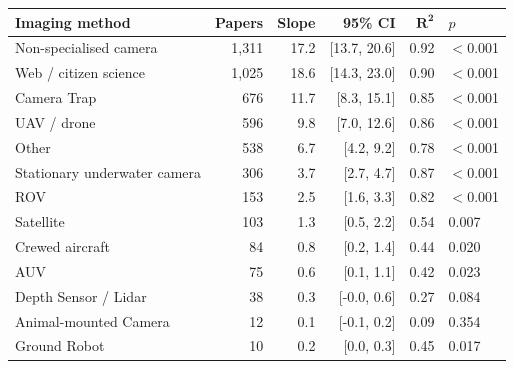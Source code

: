 \begin{tabular}{lrrrrl}
\toprule
\textbf{Imaging method} & \textbf{Papers} & \textbf{Slope} & \textbf{95\% CI} & $\mathbf{R^2}$ & \textbf{$p$} \\
\midrule
Non-specialised camera & 1,311 & 17.2 & [13.7, 20.6] & 0.92 & $<$0.001 \\
Web / citizen science & 1,025 & 18.6 & [14.3, 23.0] & 0.90 & $<$0.001 \\
Camera Trap & 676 & 11.7 & [8.3, 15.1] & 0.85 & $<$0.001 \\
UAV / drone & 596 & 9.8 & [7.0, 12.6] & 0.86 & $<$0.001 \\
Other & 538 & 6.7 & [4.2, 9.2] & 0.78 & $<$0.001 \\
Stationary underwater camera & 306 & 3.7 & [2.7, 4.7] & 0.87 & $<$0.001 \\
ROV & 153 & 2.5 & [1.6, 3.3] & 0.82 & $<$0.001 \\
Satellite & 103 & 1.3 & [0.5, 2.2] & 0.54 & 0.007 \\
Crewed aircraft & 84 & 0.8 & [0.2, 1.4] & 0.44 & 0.020 \\
AUV & 75 & 0.6 & [0.1, 1.1] & 0.42 & 0.023 \\
Depth Sensor / Lidar & 38 & 0.3 & [-0.0, 0.6] & 0.27 & 0.084 \\
Animal-mounted Camera & 12 & 0.1 & [-0.1, 0.2] & 0.09 & 0.354 \\
Ground Robot & 10 & 0.2 & [0.0, 0.3] & 0.45 & 0.017 \\
\bottomrule
\end{tabular}
